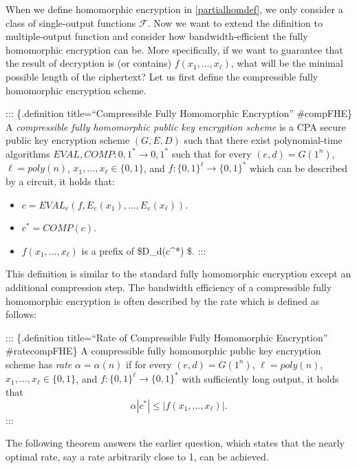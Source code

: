 When we define homomorphic encryption in \cref{partialhomdef}, we only
consider a class of single-output functions \(\mathcal{F}\). Now we want
to extend the difinition to multiple-output function and consider how
bandwidth-efficient the fully homomorphic encryption can be. More
specifically, if we want to guarantee that the result of decryption is
(or contains) \(f(x_1,\ldots,x_\ell)\), what will be the minimal
possible length of the ciphertext? Let us first define the compressible
fully homomorphic encryption scheme.

::: \{.definition title=``Compressible Fully Homomorphic Encryption''
\#compFHE\} A \emph{compressible fully homomorphic public key encryption
scheme} is a CPA secure public key encryption scheme \((G,E,D)\) such
that there exist polynomial-time algorithms
\(\ensuremath{\mathit{EVAL}}, \ensuremath{\mathit{COMP}}:{0,1}^* \rightarrow {0,1}^*\)
such that for every \((e,d)=G(1^n)\), \(\ell=poly(n)\),
\(x_1,\ldots,x_\ell \in \{0,1\}\), and
\(f:\{0,1\}^\ell\rightarrow \{0,1\}^*\) which can be described by a
circuit, it holds that:

\begin{itemize}
\item
  \(c=\ensuremath{\mathit{EVAL}}_e(f,E_e(x_1),\ldots,E_e(x_\ell))\).
\item
  \(c^*=\ensuremath{\mathit{COMP}}(c)\).
\item
  \(f(x_1,\ldots,x_\ell)\) is a prefix of \$D\_d(c\^{}*) \$. :::
\end{itemize}

This definition is similar to the standard fully homomorphic encryption
except an additional compression step. The bandwidth efficiency of a
compressible fully homomorphic encryption is often described by the rate
which is defined as follows:

::: \{.definition title=``Rate of Compressible Fully Homomorphic
Encryption'' \#ratecompFHE\} A compressible fully homomorphic public key
encryption scheme has \emph{rate} \(\alpha=\alpha(n)\) if for every
\((e,d)=G(1^n)\), \(\ell=poly(n)\), \(x_1,\ldots,x_\ell \in \{0,1\}\),
and \(f:\{0,1\}^\ell\rightarrow \{0,1\}^*\) with sufficiently long
output, it holds that
\begin{equation*}
\alpha |c^*|\leq |f(x_1,\ldots,x_\ell)|.
\end{equation*}
:::

The following theorem answers the earlier question, which states that
the nearly optimal rate, say a rate arbitrarily close to 1, can be
achieved.

